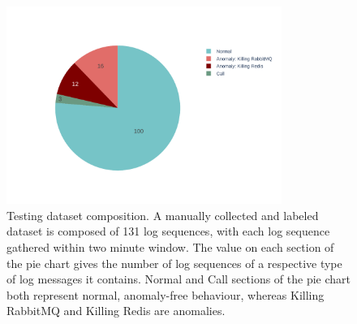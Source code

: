 \begin{figure}[h]
    \centering
    \includegraphics[width=0.8\textwidth]{img/testset-composition.pdf}
    \caption{Testing dataset composition. A manually collected and labeled dataset is composed of 131 log sequences, with each log sequence gathered within two minute window. The value on each section of the pie chart gives the number of log sequences of a respective type of log messages it contains. Normal and Call sections of the pie chart both represent normal, anomaly-free behaviour, whereas Killing RabbitMQ and Killing Redis are anomalies. }
    \label{fig:testset-composition}
\end{figure}

\begin{table}[!h]
\centering
{}
\caption{Summary of all the log datasets we worked with in our research on anomaly detection.}
\label{table:datasets}
\end{table}

